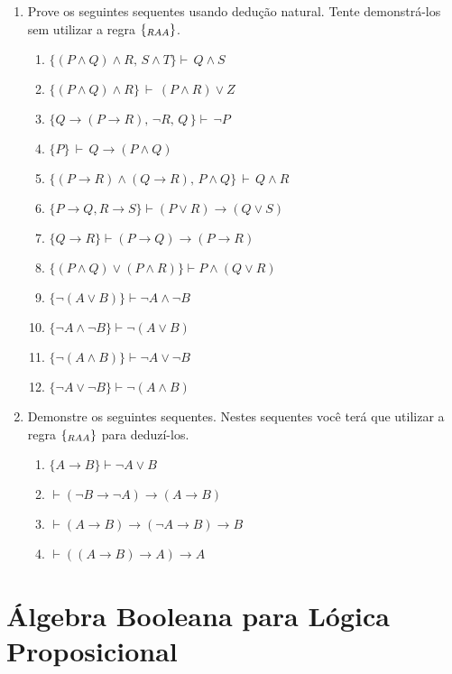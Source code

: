 \begin{enumerate}
	\item Prove os seguintes sequentes usando dedu\c{c}\~ao
          natural. Tente demonstrá-los sem utilizar a regra $\scriptsize{\{_{RAA}\}}$.
	\begin{enumerate}
		\item $\{(P\land Q)\land R,\, S\land T\}\vdash\,Q\land S$
		\item $\{(P\land Q)\land R\}\,\vdash\,(P\land R)\lor Z$
		\item $\{Q\rightarrow (P\rightarrow R),\, \neg R,\, Q\,\} \vdash\,\neg P$
		\item $\{P\}\,\vdash\, Q\rightarrow(P\land Q)$
		\item $\{(P\rightarrow R)\land (Q\rightarrow R),\, P\land Q\}\,\vdash\, Q\land R$
		\item $\{P\rightarrow Q, R\rightarrow S\}\vdash (P\lor R)\rightarrow (Q\lor S)$
		\item $\{Q\rightarrow R\}\vdash (P\rightarrow Q)\rightarrow(P\rightarrow R)$
		\item $\{(P\land Q)\lor(P\land R)\}\vdash P\land(Q\lor
                  R)$
                  \item $\{\neg(A \lor B)\}\vdash \neg A \land \neg B$
                  \item $\{\neg A \land \neg B\}\vdash \neg (A\lor B)$
                  \item $\{\neg(A \land B)\}\vdash \neg A \lor \neg B$
                  \item $\{\neg A \lor \neg B\}\vdash \neg (A\land B)$
	\end{enumerate}
        \item Demonstre os seguintes sequentes. Nestes sequentes você
          terá que utilizar a regra $\scriptsize{\{_{RAA}\}}$ para deduzí-los.
        \begin{enumerate}
             \item $\{A \to B\}\vdash \neg A \lor B$
             \item $\vdash (\neg B \to \neg A)\to (A \to B)$
             \item $\vdash (A \to B)\to (\neg A \to B) \to B$
             \item $\vdash ((A \to B)\to A)\to A$
        \end{enumerate}
\end{enumerate}

\section{Álgebra Booleana para Lógica Proposicional}

